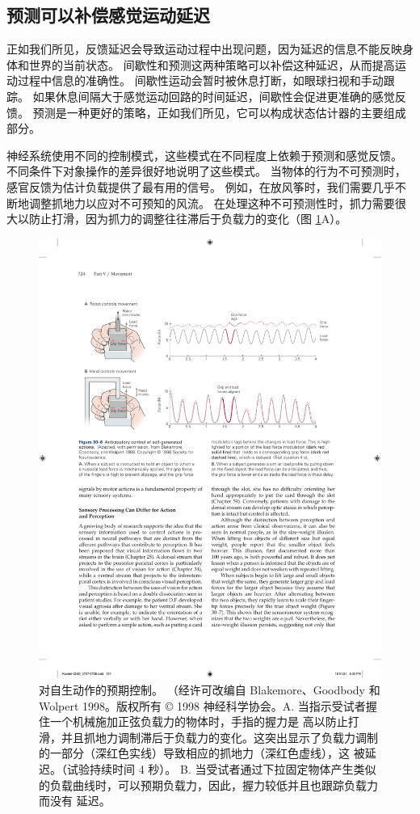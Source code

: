 \subsection{预测可以补偿感觉运动延迟}

正如我们所见，反馈延迟会导致运动过程中出现问题，因为延迟的信息不能反映身体和世界的当前状态。 间歇性和预测这两种策略可以补偿这种延迟，从而提高运动过程中信息的准确性。 间歇性运动会暂时被休息打断，如眼球扫视和手动跟踪。 如果休息间隔大于感觉运动回路的时间延迟，间歇性会促进更准确的感觉反馈。 预测是一种更好的策略，正如我们所见，它可以构成状态估计器的主要组成部分。

神经系统使用不同的控制模式，这些模式在不同程度上依赖于预测和感觉反馈。 不同条件下对象操作的差异很好地说明了这些模式。 当物体的行为不可预测时，感官反馈为估计负载提供了最有用的信号。 例如，在放风筝时，我们需要几乎不断地调整抓地力以应对不可预知的风流。 
在处理这种不可预测性时，抓力需要很大以防止打滑，因为抓力的调整往往滞后于负载力的变化（图 \ref{fig:30_6}A）。

\begin{figure}[htbp]
	\centering
	\includegraphics[width=0.9\linewidth]{chap30/fig_30_6}
	\caption{对自生动作的预期控制。 （经许可改编自 Blakemore、Goodbody 和 Wolpert 1998。版权所有 © 1998 神经科学协会。A. 当指示受试者握住一个机械施加正弦负载力的物体时，手指的握力是 高以防止打滑，并且抓地力调制滞后于负载力的变化。这突出显示了负载力调制的一部分（深红色实线）导致相应的抓地力（深红色虚线），这 被延迟。（试验持续时间 4 秒）。 B. 当受试者通过下拉固定物体产生类似的负载曲线时，可以预期负载力，因此，握力较低并且也跟踪负载力而没有 延迟。}
	\label{fig:30_6}
\end{figure}

